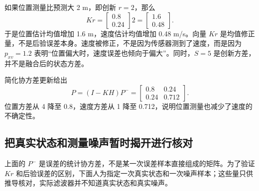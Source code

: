 \documentclass[UTF8,a4paper,11pt]{ctexart}
\newcommand{\prior}{^{-}}
\begin{document}
如果位置测量比预测大 2 m，即创新 $r=2$，那么
\begin{equation}
K r=
\begin{bmatrix}0.8\\0.24\end{bmatrix}2
=\begin{bmatrix}1.6\\0.48\end{bmatrix}.
\end{equation}
于是位置估计均值增加 1.6 m，速度估计均值增加 0.48 m/s。向量 $Kr$ 是均值修正量，不是后验误差本身。速度被修正，不是因为传感器测到了速度，而是因为 $p_{xv}=1.2$ 表明“位置偏大时，速度误差也倾向于偏大”。同时，$S=5$ 是创新方差，并不是融合后的状态方差。

简化协方差更新给出
\begin{equation}
P=(I-KH)P\prior
=\begin{bmatrix}
0.8&0.24\\
0.24&0.712
\end{bmatrix}.
\end{equation}
位置方差从 4 降至 0.8，速度方差从 1 降至 0.712，说明位置测量也减少了速度的不确定性。

\subsection{把真实状态和测量噪声暂时揭开进行核对}

上面的 $P\prior$ 是误差的统计协方差，不是某一次误差样本直接组成的矩阵。为了验证 $Kr$ 和后验误差的区别，下面人为指定一次真实状态和一次噪声样本；这些量只供推导核对，实际滤波器并不知道真实状态和真实噪声。
\end{document}
